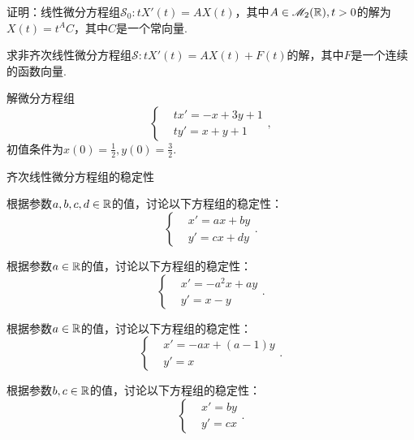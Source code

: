 \begin{problem}
  \begin{enumerate*}[left=0cm,label=(\alph*),
  itemjoin=\\]
    \item 证明：线性微分方程组$\mathscr S_0:tX'(t)=AX(t)$，其中$A\in\mathscr M_2(\mathbb R),t>0$的解为$X(t)=t^AC$，其中$C$是一个常向量.
    \item 求非齐次线性微分方程组$\mathscr S:tX'(t)=AX(t)+F(t)$的解，其中$F$是一个连续的函数向量.
  \end{enumerate*}
\end{problem}

\begin{problem}
  解微分方程组
    \[
      \left\{
        \begin{aligned}
          & tx' = -x + 3y + 1 \\
          & ty' = x + y + 1
        \end{aligned}
      \right.,
    \]
    初值条件为$x(0)=\frac12,y(0)=\frac32$.
\end{problem}

{\kaishu 齐次线性微分方程组的稳定性}

\begin{problem}
  根据参数$a,b,c,d\in\mathbb R$的值，讨论以下方程组的稳定性：
  \[
    \left\{
      \begin{aligned}
        & x' = ax + by \\
        & y' = cx + dy
      \end{aligned}
    \right..
  \]
\end{problem}

\begin{problem}
  根据参数$a\in\mathbb R$的值，讨论以下方程组的稳定性：
  \[
    \left\{
      \begin{aligned}
        & x' = -a^2x + ay \\
        & y' = x - y
      \end{aligned}
    \right..
  \]
\end{problem}

\begin{problem}
  根据参数$a\in\mathbb R$的值，讨论以下方程组的稳定性：
  \[
    \left\{
      \begin{aligned}
        & x' = -ax + (a-1)y \\
        & y' = x
      \end{aligned}
    \right..
  \]
\end{problem}

\begin{problem}
  根据参数$b,c\in\mathbb R$的值，讨论以下方程组的稳定性：
  \[
    \left\{
      \begin{aligned}
        & x' = by \\
        & y' = cx
      \end{aligned}
    \right..
  \]
\end{problem}

